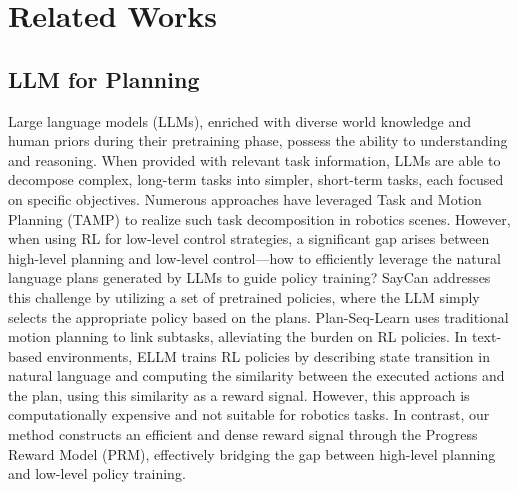 \section{Related Works}

\subsection{LLM for Planning}\label{sec:related-planning}
Large language models (LLMs), enriched with diverse world knowledge and human priors during their pretraining phase,  possess the ability to understanding and reasoning\cite{yao2023react, guo2025deepseek, yang2024qwen2, yan2023codescope, yi2024survey}.
When provided with relevant task information, LLMs are able to decompose complex, long-term tasks into simpler, short-term tasks, each focused on specific objectives\cite{khot2023decomposedpromptingmodularapproach, yuan2023tasklamaprobingcomplextask}.
Numerous approaches have leveraged Task and Motion Planning (TAMP) to realize such task decomposition in robotics scenes\cite{chen2023nl2tl, chen2024autotamp}.
However, when using RL for low-level control strategies, a significant gap arises between high-level planning and low-level control—how to efficiently leverage the natural language plans generated by LLMs to guide policy training?
SayCan\cite{brohan2023can} addresses this challenge by utilizing a set of pretrained policies, where the LLM simply selects the appropriate policy based on the plans. Plan-Seq-Learn\cite{dalal2024plan} uses traditional motion planning to link subtasks, alleviating the burden on RL policies.
In text-based environments, ELLM\cite{du2023guiding} trains RL policies by describing state transition in natural language and computing the similarity between the executed actions and the plan, using this similarity as a reward signal. However, this approach is computationally expensive and not suitable for robotics tasks.
In contrast, our method constructs an efficient and dense reward signal through the Progress Reward Model (PRM), effectively bridging the gap between high-level planning and low-level policy training.

